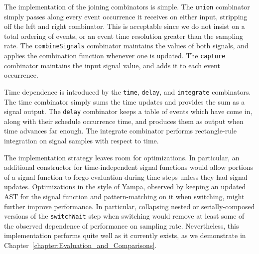The implementation of the joining combinators is simple. The {\tt union}
combinator simply passes along every event occurrence it receives on either
input, stripping off the left and right combinator. This is acceptable since we
do not insist on a total ordering of events, or an event time resolution greater
than the sampling rate. The {\tt combineSignals} combinator maintains the values
of both signals, and applies the combination function whenever one is updated.
The {\tt capture} combinator maintains the input signal value, and adds it to
each event occurrence.

Time dependence is introduced by the {\tt time}, {\tt delay}, and {\tt integrate}
combinators. The time combinator simply sums the time updates and provides the
sum as a signal output. The {\tt delay} combinator keeps a table of events
which have come in, along with their schedule occurrence time, and produces
them as output when time advances far enough. The integrate combinator performs
rectangle-rule integration on signal samples with respect to time.

The implementation strategy leaves room for optimizations. In particular, an
additional constructor for time-independent signal functions would allow
portions of a signal function to forgo evaluation during time steps unless they
had signal updates. Optimizations in the style of Yampa, observed by keeping
an updated AST for the signal function and pattern-matching on it when switching,
might further improve performance. In particular, collapsing nested or
serially-composed versions of the {\tt switchWait} step when switching would
remove at least some of the observed dependence of performance on sampling rate.
Nevertheless, this implementation performs quite well as it currently exists, as
we demonstrate in Chapter~\ref{chapter:Evaluation_and_Comparisons}.
